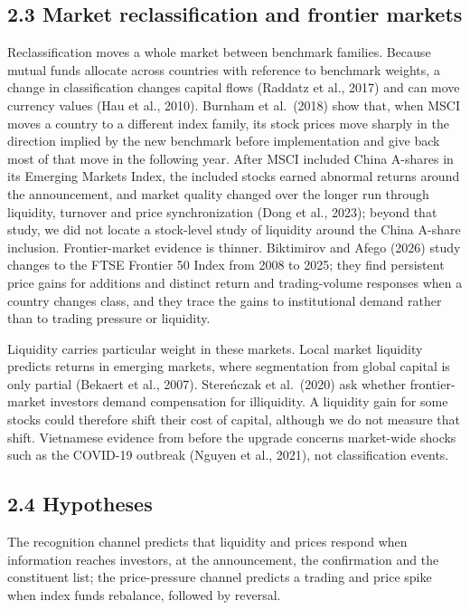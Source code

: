 \documentclass[review,authoryear,12pt]{elsarticle}
\begin{document}
\hypertarget{market-reclassification-and-frontier-markets}{%
\subsection*{2.3 Market reclassification and frontier
markets}}

Reclassification moves a whole market between benchmark families.
Because mutual funds allocate across countries with reference to
benchmark weights, a change in classification changes capital flows
(Raddatz et al., 2017) and can move currency values (Hau et al., 2010).
Burnham et al.~(2018) show that, when MSCI moves a country to a
different index family, its stock prices move sharply in the direction
implied by the new benchmark before implementation and give back most of
that move in the following year. After MSCI included China A-shares in
its Emerging Markets Index, the included stocks earned abnormal returns
around the announcement, and market quality changed over the longer run
through liquidity, turnover and price synchronization (Dong et al.,
2023); beyond that study, we did not locate a stock-level study of
liquidity around the China A-share inclusion. Frontier-market evidence
is thinner. Biktimirov and Afego (2026) study changes to the FTSE
Frontier 50 Index from 2008 to 2025; they find persistent price gains
for additions and distinct return and trading-volume responses when a
country changes class, and they trace the gains to institutional demand
rather than to trading pressure or liquidity.

Liquidity carries particular weight in these markets. Local market
liquidity predicts returns in emerging markets, where segmentation from
global capital is only partial (Bekaert et al., 2007). Stereńczak et
al.~(2020) ask whether frontier-market investors demand compensation for
illiquidity. A liquidity gain for some stocks could therefore shift
their cost of capital, although we do not measure that shift. Vietnamese
evidence from before the upgrade concerns market-wide shocks such as the
COVID-19 outbreak (Nguyen et al., 2021), not classification events.

\hypertarget{hypotheses}{%
\subsection*{2.4 Hypotheses}}

The recognition channel predicts that liquidity and prices respond when
information reaches investors, at the announcement, the confirmation and
the constituent list; the price-pressure channel predicts a trading and
price spike when index funds rebalance, followed by reversal.
\end{document}

